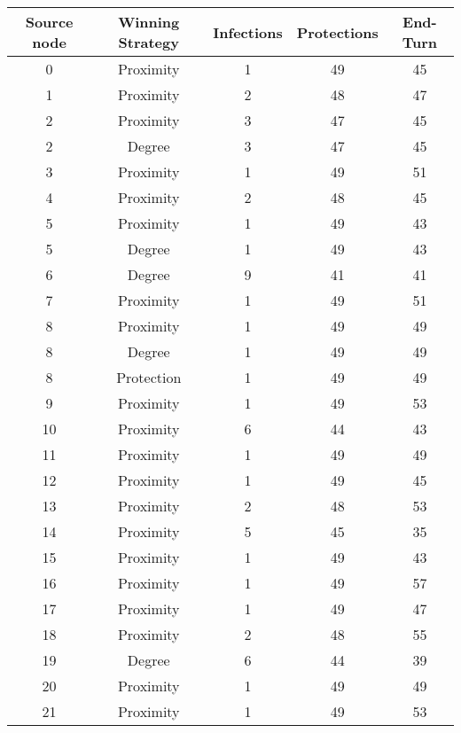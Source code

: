 \documentclass[results.tex]{subfiles}
\begin{document}
\begin{center}
  \begin{tabular}{| c || c | c | c | c |}
    \hline
    {\bfseries Source node} & {\bfseries Winning Strategy} & {\bfseries Infections} & {\bfseries Protections} & {\bfseries End-Turn} \\  %
    \hline\hline
    0 & Proximity & 1 & 49 & 45 \\ 
    \hline
    1 & Proximity & 2 & 48 & 47 \\ 
    \hline
    2 & Proximity & 3 & 47 & 45 \\ 
    \hline
    2 & Degree & 3 & 47 & 45 \\ 
    \hline
    3 & Proximity & 1 & 49 & 51 \\ 
    \hline
    4 & Proximity & 2 & 48 & 45 \\ 
    \hline
    5 & Proximity & 1 & 49 & 43 \\ 
    \hline
    5 & Degree & 1 & 49 & 43 \\ 
    \hline
    6 & Degree & 9 & 41 & 41 \\ 
    \hline
    7 & Proximity & 1 & 49 & 51 \\ 
    \hline
    8 & Proximity & 1 & 49 & 49 \\ 
    \hline
    8 & Degree & 1 & 49 & 49 \\ 
    \hline
    8 & Protection & 1 & 49 & 49 \\ 
    \hline
    9 & Proximity & 1 & 49 & 53 \\ 
    \hline
    10 & Proximity & 6 & 44 & 43 \\ 
    \hline
    11 & Proximity & 1 & 49 & 49 \\ 
    \hline
    12 & Proximity & 1 & 49 & 45 \\ 
    \hline
    13 & Proximity & 2 & 48 & 53 \\ 
    \hline
    14 & Proximity & 5 & 45 & 35 \\ 
    \hline
    15 & Proximity & 1 & 49 & 43 \\ 
    \hline
    16 & Proximity & 1 & 49 & 57 \\ 
    \hline
    17 & Proximity & 1 & 49 & 47 \\ 
    \hline
    18 & Proximity & 2 & 48 & 55 \\ 
    \hline
    19 & Degree & 6 & 44 & 39 \\ 
    \hline
    20 & Proximity & 1 & 49 & 49 \\ 
    \hline
    21 & Proximity & 1 & 49 & 53 \\ 

\end{tabular}
\end{center}
\end{document}
